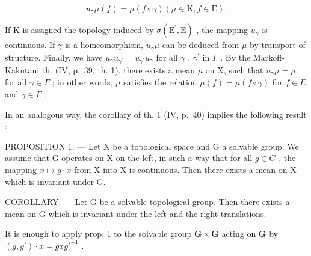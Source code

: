 \[
u _ {\gamma} \mu (f) = \mu (f \circ \gamma) (\mu \in \mathrm{K}, f \in \mathrm{E}).
\]

If K is assigned the topology induced by \(\sigma(\mathrm{E}^{\prime},\mathrm{E})\) , the mapping \(u_{\gamma}\) is continuous. If \(\gamma\) is a homeomorphism, \(u_{\gamma}\mu\) can be deduced from \(\mu\) by transport of structure. Finally, we have \(u_{\gamma}u_{\gamma^{\prime}} = u_{\gamma^{\prime}}u_{\gamma}\) for all \(\gamma\) , \(\gamma^{\prime}\) in \(\Gamma\) . By the Markoff-Kakutani th. (IV, p.~39, th. 1), there exists a mean \(\mu\) on X, such that \(u_{\gamma}\mu = \mu\) for all \(\gamma \in \Gamma\) ; in other words, \(\mu\) satisfies the relation \(\mu(f) = \mu(f \circ \gamma)\) for \(f \in E\) and \(\gamma \in \Gamma\) .

In an analogous way, the corollary of th. 1 (IV, p.~40) implies the following result :

PROPOSITION 1. --- Let X be a topological space and G a solvable group. We assume that G operates on X on the left, in such a way that for all \(g \in G\) , the mapping \(x \mapsto g \cdot x\) from X into X is continuous. Then there exists a mean on X which is invariant under G.

COROLLARY. --- Let G be a solvable topological group. Then there exists a mean on G which is invariant under the left and the right translations.

It is enough to apply prop. 1 to the solvable group \(\mathbf{G} \times \mathbf{G}\) acting on \(\mathbf{G}\) by \((g, g') \cdot x = gxg'^{-1}\) .

